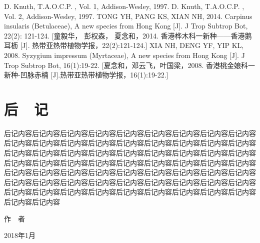 \documentclass[utf8]{book}
\begin{document}
\renewcommand\indexname{索~~引}
\printindex
{}

\backmatter


\begin{thebibliography}{参考文献}
 D. Knuth, T.A.O.C.P. , Vol. 1, Addison-Wesley, 1997.
 D. Knuth, T.A.O.C.P. , Vol. 2, Addison-Wesley, 1997.
 TONG YH, PANG KS, XIAN NH, 2014. Carpinus insularis (Betulaceae), A new species from Hong Kong [J]. J Trop Subtrop Bot, 22(2): 121-124. [童毅华， 彭权森， 夏念和，2014. 香港桦木科一新种——香港鹅耳枥 [J]. 热带亚热带植物学报，22(2):121-124.]
 XIA NH, DENG YF, YIP KL, 2008. Syzygium impressum (Myrtaceae), A new species from Hong Kong [J]. J Trop Subtrop Bot, 16(1):19-22. [夏念和，邓云飞，叶国梁，2008. 香港桃金娘科一新种-凹脉赤楠 [J].热带亚热带植物学报，16(1):19-22.]
\end{thebibliography}

\chapter{后~~记}

后记内容后记内容后记内容后记内容后记内容后记内容后记内容后记内容后记内容后记内容后记内容后记内容后记内容后记内容后记内容后记内容后记内容后记内容后记内容后记内容后记内容后记内容后记内容后记内容后记内容后记内容后记内容后记内容后记内容后记内容后记内容后记内容后记内容后记内容后记内容后记内容后记内容后记内容后记内容后记内容后记内容后记内容后记内容后记内容后记内容后记内容后记内容后记内容后记内容后记内容后记内容后记内容后记内容后记内容后记内容后记内容后记内容后记内容后记内容后记内容后记内容后记内容后记内容后记内容后记内容

\begin{flushright}
作~~者~~~~~~~~~

2018年1月~~~~~
\end{flushright}
\end{document}
